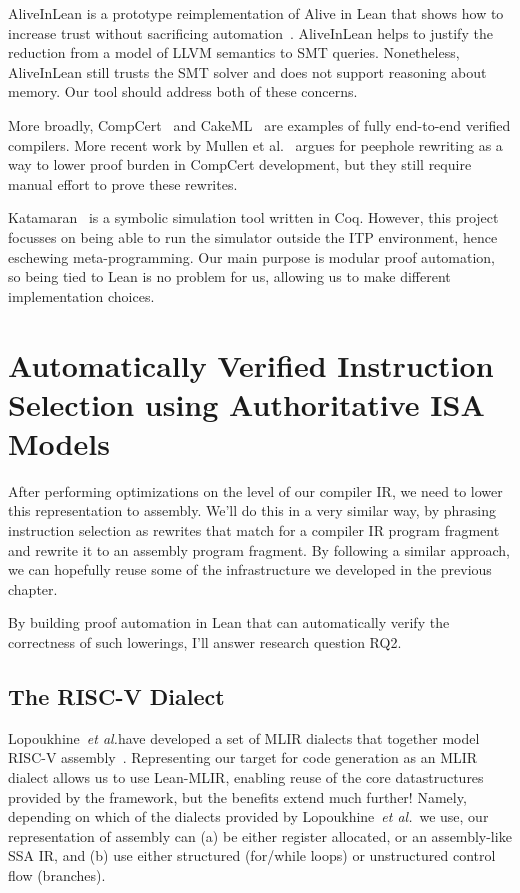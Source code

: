 \documentclass[a4paper]{scrartcl}
\newcommand*{\etal}{~\emph{et al.}}
\begin{document}
AliveInLean is a prototype reimplementation of Alive in Lean that shows how to increase trust without
sacrificing automation~\cite{leeAliveInLeanVerifiedLLVM2019}. AliveInLean helps to justify the reduction from a model of LLVM semantics
to SMT queries. Nonetheless, AliveInLean still trusts the SMT solver and does not support reasoning about memory. 
Our tool should address both of these concerns.

More broadly, CompCert~\cite{leroyCompCertFormallyVerified} and
CakeML~\cite{kumarCakeMLVerifiedImplementation2014} are examples
of fully end-to-end verified compilers. More recent work by Mullen et
al.~\cite{mullenVerifiedPeepholeOptimizations2016} argues for
peephole rewriting as a way to lower proof burden in CompCert
development, but they still require manual effort to prove these rewrites.

Katamaran~\cite{keuchelVerifiedSymbolicExecution2022} is a
symbolic simulation tool written in Coq. However, this
project focusses on being able to run the simulator outside the ITP
environment, hence eschewing meta-programming. Our main purpose is
modular proof automation, so being tied to Lean is no problem for us,
allowing us to make different implementation choices.

\section{Automatically Verified Instruction Selection using
Authoritative ISA Models}\label{scaling-high-assurance-translation-validation-to-authoritative-isa-models}

After performing optimizations on the level of our compiler IR, we need
to lower this representation to assembly. We'll do this in a very
similar way, by phrasing instruction selection as rewrites that match
for a compiler IR program fragment and rewrite it to an assembly program
fragment. By following a similar approach, we can hopefully reuse some
of the infrastructure we developed in the previous chapter.

By building proof automation in Lean that can automatically verify the correctness of
such lowerings, I'll answer research question \textsc{RQ2}.

\subsection{The RISC-V Dialect}\label{the-risc-v-dialect}

Lopoukhine\etal{}have developed a set of MLIR
dialects that together model RISC-V assembly~\cite{lopoukhineMultiLevelCompilerBackend}. Representing our target
for code generation as an MLIR dialect allows us to use Lean-MLIR,
enabling reuse of the core datastructures provided by the framework, but
the benefits extend much further! Namely, depending on which of the
dialects provided by Lopoukhine\etal{}~we use, our representation of
assembly can (a) be either register allocated, or an assembly-like
SSA IR, and (b) use either structured (for/while loops) or unstructured
control flow (branches).
\end{document}
